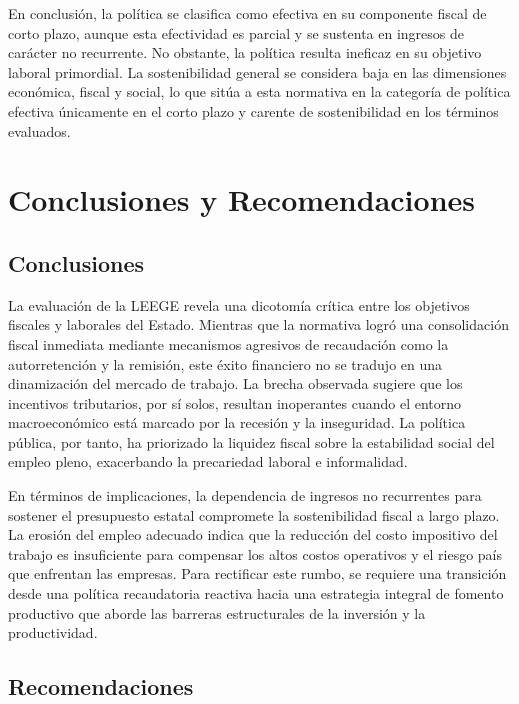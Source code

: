 \documentclass[12pt,spanish]{article}
\begin{document}
En conclusión, la política se clasifica como efectiva en su componente
fiscal de corto plazo, aunque esta efectividad es parcial y se sustenta
en ingresos de carácter no recurrente. No obstante, la política resulta
ineficaz en su objetivo laboral primordial. La sostenibilidad general se
considera baja en las dimensiones económica, fiscal y social, lo que
sitúa a esta normativa en la categoría de política efectiva únicamente
en el corto plazo y carente de sostenibilidad en los términos evaluados.

\section{Conclusiones y
Recomendaciones}\label{conclusiones-y-recomendaciones}

\subsection{Conclusiones}\label{conclusiones}

La evaluación de la LEEGE revela una dicotomía crítica entre los
objetivos fiscales y laborales del Estado. Mientras que la normativa
logró una consolidación fiscal inmediata mediante mecanismos agresivos
de recaudación como la autorretención y la remisión, este éxito
financiero no se tradujo en una dinamización del mercado de trabajo. La
brecha observada sugiere que los incentivos tributarios, por sí solos,
resultan inoperantes cuando el entorno macroeconómico está marcado por
la recesión y la inseguridad. La política pública, por tanto, ha
priorizado la liquidez fiscal sobre la estabilidad social del empleo
pleno, exacerbando la precariedad laboral e informalidad.

En términos de implicaciones, la dependencia de ingresos no recurrentes
para sostener el presupuesto estatal compromete la sostenibilidad fiscal
a largo plazo. La erosión del empleo adecuado indica que la reducción
del costo impositivo del trabajo es insuficiente para compensar los
altos costos operativos y el riesgo país que enfrentan las empresas.
Para rectificar este rumbo, se requiere una transición desde una
política recaudatoria reactiva hacia una estrategia integral de fomento
productivo que aborde las barreras estructurales de la inversión y la
productividad.

\subsection{Recomendaciones}\label{recomendaciones}
\end{document}
